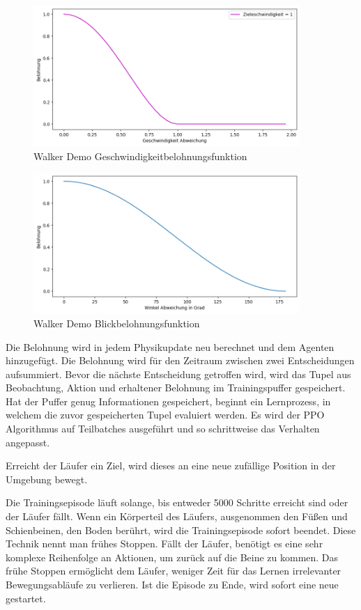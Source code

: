 \begin{figure}[H]
  \centering  
  \includegraphics[width=0.9\textwidth]{img/plot_demo_vel_1}
  \caption{Walker Demo Geschwindigkeitbelohnungsfunktion}
  \label{fig:plot_demo_vel_1}
\end{figure}

\begin{figure}[H]
  \centering  
  \includegraphics[width=0.9\textwidth]{img/plot_demo_look}
  \caption{Walker Demo Blickbelohnungsfunktion}
  \label{fig:plot_demo_look}
\end{figure}

Die Belohnung wird in jedem Physikupdate neu berechnet und dem Agenten hinzugefügt. Die Belohnung wird für den Zeitraum zwischen zwei Entscheidungen aufsummiert. Bevor die nächste Entscheidung getroffen wird, wird das Tupel aus Beobachtung, Aktion und erhaltener Belohnung im Trainingspuffer gespeichert. Hat der Puffer genug Informationen gespeichert, beginnt ein Lernprozess, in welchem die zuvor gespeicherten Tupel evaluiert werden. Es wird der PPO Algorithmus auf Teilbatches ausgeführt und so schrittweise das Verhalten angepasst.

Erreicht der Läufer ein Ziel, wird dieses an eine neue zufällige Position in der Umgebung bewegt.

Die Trainingsepisode läuft solange, bis entweder 5000 Schritte erreicht sind oder der Läufer fällt. Wenn ein Körperteil des Läufers, ausgenommen den Füßen und Schienbeinen, den Boden berührt, wird die Trainingsepisode sofort beendet. Diese Technik nennt man \grqq{}frühes Stoppen\grqq{}. Fällt der Läufer, benötigt es eine sehr komplexe Reihenfolge an Aktionen, um zurück auf die Beine zu kommen. Das frühe Stoppen ermöglicht dem Läufer, weniger Zeit für das Lernen irrelevanter Bewegungsabläufe zu verlieren. Ist die Episode zu Ende, wird sofort eine neue gestartet.

